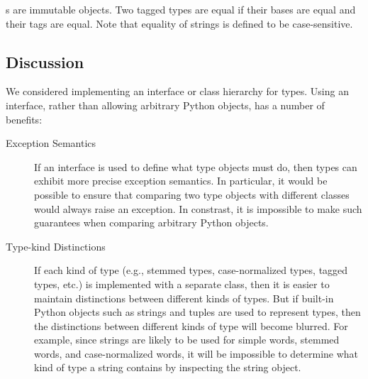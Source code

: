 \documentclass[11pt]{article}
\begin{document}
      \noindent
      s are immutable objects.  Two tagged types are
      equal if their bases are equal and their tags are equal.  Note
      that equality of strings is defined to be case-sensitive.
    
  \subsection{Discussion}

  We considered implementing an interface or class hierarchy for
  types.  Using an interface, rather than allowing arbitrary Python
  objects, has a number of benefits:

  \begin{description}

    \item[Exception Semantics] If an interface is used to define what
    type objects must do, then types can exhibit more precise
    exception semantics.  In particular, it would be possible to
    ensure that comparing two type objects with different classes
    would always raise an exception.  In constrast, it is impossible
    to make such guarantees when comparing arbitrary Python objects.

    \item[Type-kind Distinctions] If each kind of type (e.g., stemmed
    types, case-normalized types, tagged types, etc.) is implemented
    with a separate class, then it is easier to maintain distinctions
    between different kinds of types.  But if built-in Python objects
    such as strings and tuples are used to represent types, then the
    distinctions between different kinds of type will become blurred.
    For example, since strings are likely to be used for simple words,
    stemmed words, and case-normalized words, it will be impossible to
    determine what kind of type a string contains by inspecting the
    string object.

  \end{description}
\end{document}
